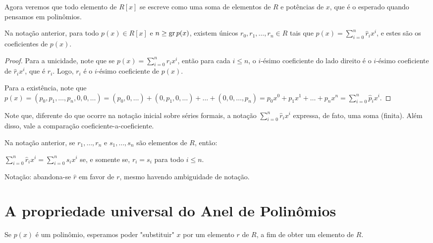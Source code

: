 Agora veremos que todo elemento de $R[x]$ se escreve como uma soma de elementos de $R$ e potências de $x$, que é o esperado quando pensamos em polinômios.
\begin{prop}
    Na notação anterior, para todo $p(x)\in R[x]$ e $n\geq \operatorname{gr} p(x)$, existem únicos $r_0, r_1, \dots, r_n\in R$ tais que $p(x)=\sum_{i=0}^n \hat r_ix^i$, e estes são os coeficientes de $p(x)$.
\end{prop}
    
\begin{proof}
    Para a unicidade, note que se $p(x)=\sum_{i=0}^n \hat r_ix^i$, então para cada $i\leq n$, o $i$-ésimo coeficiente do lado direito é o $i$-ésimo coeficiente de $\hat r_ix^i$, que é $r_i$.
    Logo, $r_i$ é o $i$-ésimo coeficiente de $p(x)$.

    Para a existência, note que $p(x)=(p_0, p_1, \dots, p_n, 0, 0, \dots)=(p_0, 0, \dots)+(0, p_1, 0, \dots)+\dots+(0, 0, \dots, p_n)=p_0x^0+p_1x^1+\dots+p_nx^n=\sum_{i=0}^n \hat p_ix^i$.
\end{proof}
Note que, diferente do que ocorre na notação inicial sobre séries formais, a notação $\sum_{i=0}^n \hat r_i x^i$ expressa, de fato, uma soma (finita). Além disso, vale a comparação coeficiente-a-coeficiente.
\begin{corol}
    Na notação anterior, se $r_1, \dots, r_n$ e $s_1, \dots, s_n$ são elementos de $R$, então:

    $\sum_{i=0}^n \hat r_i x^i=\sum_{i=0}^n \hat s_i x^i$ se, e somente se, $r_i=s_i$ para todo $i\leq n$.
\end{corol}
Notação: abandona-se $\hat r$ em favor de $r$, mesmo havendo ambiguidade de notação.
\section{A propriedade universal do Anel de Polinômios}

Se $p(x)$ é um polinômio, esperamos poder "substituir" $x$ por um elemento $r$ de $R$, a fim de obter um elemento de $R$.


